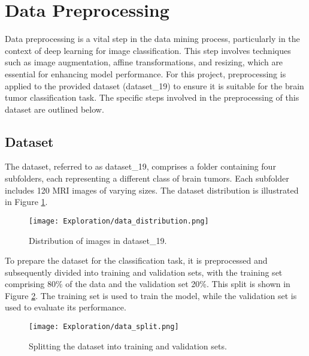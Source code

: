 \section{Data Preprocessing}\label{data_preprocessing}

Data preprocessing is a vital step in the data mining process, particularly in the context of deep learning for image classification. This step involves techniques such as image augmentation, affine transformations, and resizing, which are essential for enhancing model performance. For this project, preprocessing is applied to the provided dataset (dataset\_19) to ensure it is suitable for the brain tumor classification task. The specific steps involved in the preprocessing of this dataset are outlined below.

\subsection{Dataset}\label{dataset_given}

The dataset, referred to as dataset\_19, comprises a folder containing four subfolders, each representing a different class of brain tumors. Each subfolder includes 120 MRI images of varying sizes. The dataset distribution is illustrated in Figure \ref{fig:data_distribution}.

\begin{figure}[H]
  \begin{center}
    \texttt{[image: Exploration/data\_distribution.png]}
  \end{center}
  \caption{Distribution of images in dataset\_19.}\label{fig:data_distribution}
\end{figure}

To prepare the dataset for the classification task, it is preprocessed and subsequently divided into training and validation sets, with the training set comprising 80\% of the data and the validation set 20\%. This split is shown in Figure \ref{fig:data_split}. The training set is used to train the model, while the validation set is used to evaluate its performance.

\begin{figure}[H]
  \begin{center}
    \texttt{[image: Exploration/data\_split.png]}
  \end{center}
  \caption{Splitting the dataset into training and validation sets.}\label{fig:data_split}
\end{figure}

